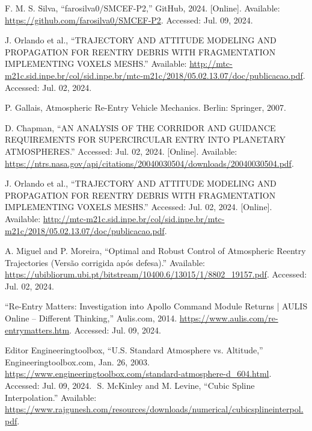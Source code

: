 \documentclass[runningheads]{llncs}
\begin{document}
\begin{thebibliography}{10}

F. M. S. Silva, ``farosilva0/SMCEF-P2,'' GitHub, 2024. [Online]. Available: \url{https://github.com/farosilva0/SMCEF-P2}. Accessed: Jul. 09, 2024.

J. Orlando et al., “TRAJECTORY AND ATTITUDE MODELING AND PROPAGATION FOR REENTRY DEBRIS WITH FRAGMENTATION IMPLEMENTING VOXELS MESHS.” Available: \url{http://mtc-m21c.sid.inpe.br/col/sid.inpe.br/mtc-m21c/2018/05.02.13.07/doc/publicacao.pdf}. Accessed: Jul. 02, 2024.

P. Gallais, Atmospheric Re-Entry Vehicle Mechanics. Berlin: Springer, 2007.

D. Chapman, “AN ANALYSIS OF THE CORRIDOR AND GUIDANCE REQUIREMENTS FOR SUPERCIRCULAR ENTRY INTO PLANETARY ATMOSPHERES.” Accessed: Jul. 02, 2024. [Online]. Available: \url{https://ntrs.nasa.gov/api/citations/20040030504/downloads/20040030504.pdf}.

J. Orlando et al., “TRAJECTORY AND ATTITUDE MODELING AND PROPAGATION FOR REENTRY DEBRIS WITH FRAGMENTATION IMPLEMENTING VOXELS MESHS.” Accessed: Jul. 02, 2024. [Online]. Available: \url{http://mtc-m21c.sid.inpe.br/col/sid.inpe.br/mtc-m21c/2018/05.02.13.07/doc/publicacao.pdf}.

A. Miguel and P. Moreira, “Optimal and Robust Control of Atmospheric Reentry Trajectories (Versão corrigida após defesa).” Available: \url{https://ubibliorum.ubi.pt/bitstream/10400.6/13015/1/8802\_19157.pdf}. Accessed: Jul. 02, 2024.


“Re-Entry Matters: Investigation into Apollo Command Module Returns | AULIS Online – Different Thinking,” Aulis.com, 2014. \url{https://www.aulis.com/re-entrymatters.htm}. Accessed: Jul. 09, 2024.


Editor Engineeringtoolbox, “U.S. Standard Atmosphere vs. Altitude,” Engineeringtoolbox.com, Jan. 26, 2003. \url{https://www.engineeringtoolbox.com/standard-atmosphere-d\_604.html}. Accessed: Jul. 09, 2024.
‌
S. McKinley and M. Levine, “Cubic Spline Interpolation.” Available: \url{https://www.rajgunesh.com/resources/downloads/numerical/cubicsplineinterpol.pdf}.


\end{thebibliography}
\end{document}
